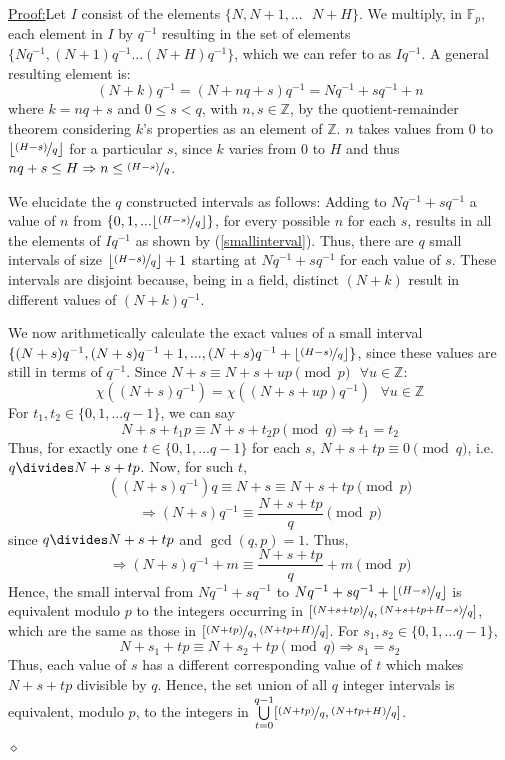 \documentclass{report}
\newenvironment{claimproof}[1]{\vspace{2.5mm}\par\noindent\underline{Proof:}\space#1}{\hfill $\diamond$ \vspace{2.5mm} \par}
\begin{document}
\begin{claimproof}
Let $I$ consist of the elements $\{N,N+1,...\text{ }N+H\}$. We multiply, in $\mathbb{F}_p$, each element in $I$ by $q^{-1}$ resulting in the set of elements $\{Nq^{-1},(N+1)q^{-1}...(N+H)q^{-1}\}$, which we can refer to as $Iq^{-1}$. A general resulting element is:
\begin{equation} \label{smallinterval}
    (N+k)q^{-1}=(N+nq+s)q^{-1}=Nq^{-1}+sq^{-1}+n
\end{equation}
where $k=nq+s$ and $0\leq s<q$, with $n,s\in\mathbb{Z}$, by the quotient-remainder theorem considering $k$'s properties as an element of $\mathbb{Z}$. $n$ takes values from $0$ to $\lfloor\nicefrac{(H-s)}{q}\rfloor$ for a particular $s$, since $k$ varies from $0$ to $H$ and thus $nq+s\leq H \Rightarrow n\leq \nicefrac{(H-s)}{q}$.

We elucidate the $q$ constructed intervals as follows: Adding to $Nq^{-1}+sq^{-1}$ a value of $n$ from $\{0,1,...\lfloor\nicefrac{(H-s)}{q}\rfloor\}$, for every possible $n$ for each $s$, results in all the elements of $Iq^{-1}$ as shown by (\ref{smallinterval}). Thus, there are $q$ small intervals of size $\lfloor\nicefrac{(H-s)}{q}\rfloor +1$ starting at $Nq^{-1}+sq^{-1}$ for each value of $s$. These intervals are disjoint because, being in a field, distinct $(N+k)$ result in different values of $(N+k)q^{-1}$.

We now arithmetically calculate the exact values of a small interval $\{(N+s)q^{-1},(N+s)q^{-1}+1, ...,(N+s)q^{-1}+\lfloor\nicefrac{(H-s)}{q}\rfloor\}$, since these values are still in terms of $q^{-1}$. Since $N+s\equiv N+s+up\pmod p  \text{ } \forall u\in \mathbb{Z}$:
\[\chi((N+s)q^{-1})=\chi((N+s+up)q^{-1}) \text{  } \forall u\in \mathbb{Z}\]
For $t_1,t_2\in\{0, 1,... q-1\}$, we can say
\[N+s+t_1p \equiv N+s+t_2p \pmod q \Rightarrow t_1=t_2\]
Thus, for exactly one $t\in\{0, 1,... q-1\}$ for each $s$, $N+s+tp \equiv 0 \pmod q$, i.e. $q\divides N+s+tp$. Now, for such $t$,
\[((N+s)q^{-1})q\equiv N+s \equiv N+s+tp \pmod p\]
\[\Rightarrow (N+s)q^{-1} \equiv \frac{N+s+tp}{q} \pmod p\]
since $q\divides N+s+tp$ and $\gcd (q,p)=1$. Thus,
\[\Rightarrow (N+s)q^{-1} + m\equiv \frac{N+s+tp}{q} + m \pmod p\]
Hence, the small interval from $Nq^{-1}+sq^{-1}$ to $Nq^{-1}+sq^{-1} + \lfloor\nicefrac{(H-s)}{q}\rfloor$ is equivalent modulo $p$ to the integers occurring in $[\nicefrac{(N+s+tp)}{q},\nicefrac{(N+s+tp+H-s)}{q}]$, which are the same as those in $[\nicefrac{(N+tp)}{q},\nicefrac{(N+tp+H)}{q}]$. For $s_1,s_2\in\{0, 1,... q-1\}$,
\[N+s_1+tp \equiv N+s_2+tp \pmod q \Rightarrow s_1=s_2\]
Thus, each value of $s$ has a different corresponding value of $t$ which makes $ N+s+tp$ divisible by $q$. Hence, the set union of all $q$ integer intervals is equivalent, modulo $p$, to the integers in $\bigcup\limits_{t=0}^{q-1} [\nicefrac {(N+tp)} {q},\nicefrac {(N+tp+H)}{q}]$.


\end{claimproof}
\end{document}

